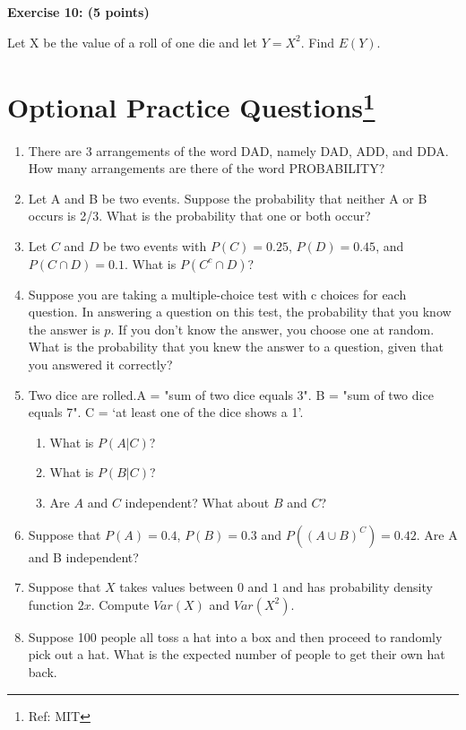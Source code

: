 \documentclass[11pt]{article}
\begin{document}
{\bf Exercise 10: (5 points)}


Let X be the value of a roll of one die and let $Y = X^2$. Find $E(Y )$.





\section{Optional Practice Questions\footnote{Ref: MIT }}


\begin{enumerate}
    \item There are 3 arrangements of the word DAD, namely DAD, ADD, and DDA. How many arrangements are there of the word PROBABILITY?
    
    \item Let A and B be two events. Suppose the probability that neither A or B occurs is 2/3. What is the probability that one or both occur?
    
    \item Let $C$ and $D$ be two events with $P(C) = 0.25$, $P(D) = 0.45$, and $P(C  \cap D) = 0.1$. What is $P(C^c \cap D)$?
    
    \item Suppose you are taking a multiple-choice test with c choices for each question. In answering a question on this test, the probability that you know the answer is $p$. If you don’t know the answer, you choose one at random. What is the probability that you knew the answer to a question, given that you answered it correctly?
    \item Two dice are rolled.A = "sum of two dice equals 3". B = "sum of two dice equals 7". C = ‘at least one of the dice shows a 1’.
    \begin{enumerate}
        \item What is $P(A|C)$?
        \item What is $P(B|C)$?
        \item Are $A$ and $C$ independent? What about $B$ and $C$?
    \end{enumerate}
    \item Suppose that $P(A) = 0.4$, $P(B) = 0.3$ and $P((A \cup B)^C) = 0.42$. Are A and B independent?
    
    \item Suppose that $X$ takes values between $0$ and $1$ and has probability density function $2x$. Compute $Var(X)$ and $Var(X^2)$.
    
    \item Suppose 100 people all toss a hat into a box and then proceed to randomly pick out
a hat. What is the expected number of people to get their own hat back.


\end{enumerate}
\end{document}
